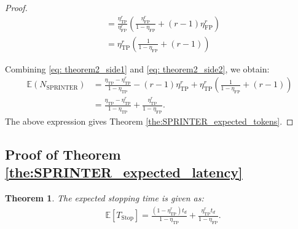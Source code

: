 \documentclass{article}
\theoremstyle{plain}
\newtheorem{theorem}{Theorem}[section]
\theoremstyle{definition}
\theoremstyle{remark}
\begin{document}
\begin{proof}
\begin{align}
        &= \frac{\eta_\text{TP}^r}{\eta_\text{FP}^r}\left( \frac{\eta_\text{FP}^{r}}{1-\eta_\text{FP}} + (r-1)\eta_\text{FP}^{r}\right)\nonumber\\
        &= \eta_\text{TP}^r \left( \frac{1}{1-\eta_\text{FP}} + (r-1)\right) \label{eq: theorem2_side2}
    \end{align}
    
    Combining \eqref{eq: theorem2_side1} and \eqref{eq: theorem2_side2}, we obtain:
    \begin{align}
         \mathbb{E}(N_\text{SPRINTER}) &= \frac{\eta_\text{TP}-\eta_\text{TP}^{r}}{1-\eta_\text{TP}} -(r-1)\eta_\text{TP}^{r} +  \eta_\text{TP}^r \left( \frac{1}{1-\eta_\text{FP}} + (r-1)\right) \nonumber\\
         &= \frac{\eta_\text{TP}-\eta_\text{TP}^r}{1-\eta_\text{TP}} + \frac{\eta_\text{TP}^r}{1-\eta_\text{FP}}.
    \end{align}
    The above expression gives Theorem \ref{the:SPRINTER_expected_tokens}.
\end{proof}
    \subsection{Proof of Theorem \ref{the:SPRINTER_expected_latency} }
\begingroup
\renewcommand{\thetheorem}{\ref{the:SPRINTER_expected_latency}} 
\label{sec:lat_proof}
\begin{theorem}
 The expected stopping time is given as:
    \begin{align}
        \label{eq:SPRINT_EXP_LATENCY}
        & \mathbb{E}[T_\text{Stop}] =  \frac{(1-\eta_{\text{TP}}^r) t_d}{1-\eta_\text{TP}} + \frac{\eta_\text{TP}^rt_d}{1-\eta_\text{FP}}.
    \end{align} 
\end{theorem}
\endgroup
\end{document}
